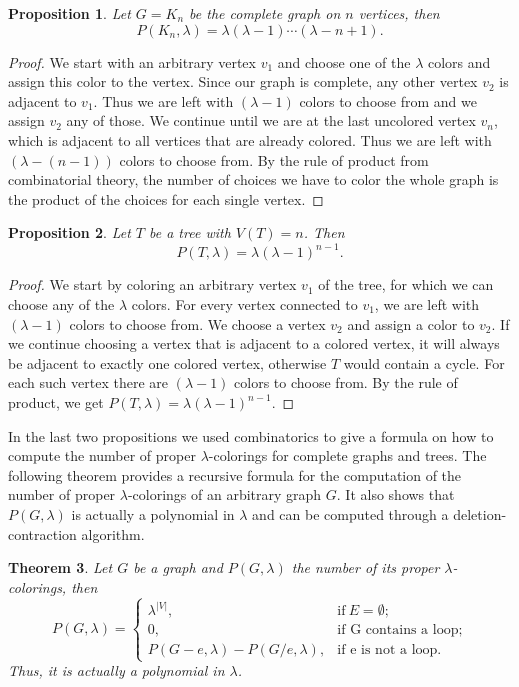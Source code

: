 \documentclass[12pt,a4paper, twoside, autooneside=false]{scrartcl}
\newtheorem{theorem}{Theorem}[section]
\newtheorem{proposition}[theorem]{Proposition}
\theoremstyle{definition}
\theoremstyle{remark}
\numberwithin{equation}{section}
\begin{document}
\begin{proposition} 
Let $G = K_n$ be the complete graph on $n$ vertices, then 
\[
P(K_n, \lambda) = \lambda(\lambda - 1) \cdots (\lambda - n + 1).
\]
\end{proposition}
\begin{proof}
We start with an arbitrary vertex $v_1$ and choose one of the $\lambda$ colors and assign this color to the vertex. Since our graph is complete, any other vertex $v_2$ is adjacent to $v_1$. Thus we are left with $(\lambda - 1)$ colors to choose from and we assign $v_2$ any of those. We continue until we are at the last uncolored vertex $v_n$, which is adjacent to all vertices that are already colored. Thus we are left with $(\lambda - (n - 1))$ colors to choose from. By the rule of product from combinatorial theory, the number of choices we have to color the whole graph is the product of the choices for each single vertex.
\end{proof}
\begin{proposition}
Let $T$ be a tree with $V(T) = n$. Then 
\[
P(T, \lambda) = \lambda (\lambda - 1)^{n - 1}.
\]
\end{proposition}
\begin{proof}We start by coloring an arbitrary vertex $v_1$ of the tree, for which we can choose any of the $\lambda$ colors. For every vertex connected to $v_1$, we are left with $(\lambda - 1)$ colors to choose from. We choose a vertex $v_2$ and assign a color to $v_2$. If we continue choosing a vertex that is adjacent to a colored vertex, it will always be adjacent to exactly one colored vertex, otherwise $T$ would contain a cycle. For each such vertex there are $(\lambda - 1)$ colors to choose from. By the rule of product, we get $ P(T, \lambda) = \lambda (\lambda - 1)^{n - 1}$. 
\end{proof}
In the last two propositions we used combinatorics to give a formula on how to compute the number of proper $\lambda$-colorings for complete graphs and trees. The following theorem provides a recursive formula for the computation of the number of proper $\lambda$-colorings of an arbitrary graph $G$. It also shows that $P(G, \lambda)$ is actually a polynomial in $\lambda$ and can be computed through a deletion-contraction algorithm.
\begin{theorem}
Let $G$ be a graph and $P(G, \lambda)$ the number of its proper $\lambda$-colorings, then 
\[
P(G,\lambda) = \begin{cases}
\lambda^{|V|}, & \text{if} \  E = \emptyset; \\
0, & \text{if G contains a loop;} \\
P(G -  e, \lambda) - P(G/e,\lambda), & \text{if e is not a loop.}
\end{cases}
\]
Thus, it is actually a polynomial in $\lambda$. 
\end{theorem}
\end{document}
